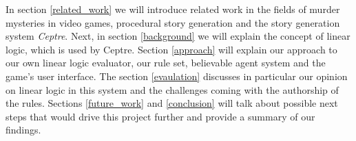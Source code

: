 In section \ref{related_work} we will introduce related work in the fields of murder mysteries in video games, procedural story generation and the story generation system \emph{Ceptre}.
Next, in section \ref{background} we will explain the concept of linear logic, which is used by Ceptre.
Section \ref{approach} will explain our approach to our own linear logic evaluator, our rule set, believable agent system and the game's user interface.
The section \ref{evaulation} discusses in particular our opinion on linear logic in this system and the challenges coming with the authorship of the rules.
Sections \ref{future_work} and \ref{conclusion} will talk about possible next steps that would drive this project further and provide a summary of our findings.
